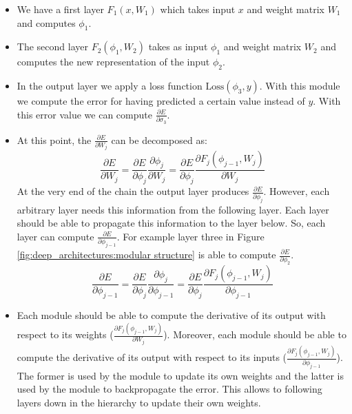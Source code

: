 \begin{itemize}
	\item We have a first layer $F_{1}(x, W_{1})$ which takes input $x$ and weight
		matrix $W_{1}$ and computes $\phi_{1}$.

	\item The second layer $F_{2}(\phi_{1}, W_{2})$ takes as input $\phi_{1}$ and weight
		matrix $W_{2}$ and computes the new representation of the input $\phi_{2}$.

	\item In the output layer we apply a loss function $\text{Loss}(\phi_{3}, y)$.
		With this module we compute the error for having predicted a certain value
		instead of $y$. With this error value we can compute $\frac{\partial E}{\partial
		\sigma_{3}}$.

	\item At this point, the $\frac{\partial E}{\partial W_{j}}$ can be decomposed
		as:
		\[
			\frac{\partial E}{\partial W_{j}}= \frac{\partial E}{\partial \phi_{j}}\frac{\partial
			\phi_{j}}{\partial W_{j}}= \frac{\partial E}{\partial \phi_{j}}\frac{\partial
			F_{j}(\phi_{j-1}, W_{j})}{\partial W_{j}}
		\]
		At the very end of the chain the output layer produces $\frac{\partial E}{\partial
		\phi_{j}}$. However, each arbitrary layer needs this information from the following
		layer. Each layer should be able to propagate this information to the layer
		below. So, each layer can compute $\frac{\partial E}{\partial \phi_{j-1}}$. For
		example layer three in Figure \ref{fig:deep_architectures:modular structure}
		is able to compute $\frac{\partial E}{\partial \phi_{2}}$.
		\[
			\frac{\partial E}{\partial \phi_{j-1}}= \frac{\partial E}{\partial \phi_{j}}
			\frac{\partial \phi_{j}}{\partial \phi_{j-1}}= \frac{\partial E}{\partial
			\phi_{j}}\frac{\partial F_{j}(\phi_{j-1}, W_{j})}{\partial \phi_{j-1}}
		\]

	\item Each module should be able to compute the derivative of its output with respect
		to its weights ($\frac{\partial F_{j}(\phi_{j-1}, W_{j})}{\partial W_{j}}$).
		Moreover, each module should be able to compute the derivative of its output
		with respect to its inputs ($\frac{\partial F_{j}(\phi_{j-1}, W_{j})}{\partial
		\phi_{j-1}}$). The former is used by the module to update its own weights
		and the latter is used by the module to backpropagate the error. This allows
		to following layers down in the hierarchy to update their own weights.
\end{itemize}

